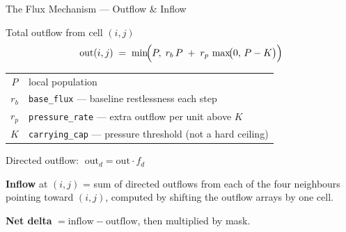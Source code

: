 \documentclass[aspectratio=169]{beamer}
\begin{document}
\begin{frame}{The Flux Mechanism — Outflow \& Inflow}
  \begin{block}{Total outflow from cell $(i,j)$}
    \[
      \mathrm{out}(i,j) \;=\;
        \min\!\Bigl(P,\;
          r_b\,P \;+\; r_p\,\max\!\bigl(0,\,P - K\bigr)
        \Bigr)
    \]
  \end{block}

  \begin{tabular}{@{}cl@{}}
    $P$   & local population \\
    $r_b$ & \texttt{base\_flux} — baseline restlessness each step \\
    $r_p$ & \texttt{pressure\_rate} — extra outflow per unit above $K$ \\
    $K$   & \texttt{carrying\_cap} — pressure threshold (not a hard ceiling) \\
  \end{tabular}

  \vspace{0.8em}
  Directed outflow: $\;\mathrm{out}_d = \mathrm{out}\cdot f_d$

  \vspace{0.4em}
  \textbf{Inflow} at $(i,j)$ = sum of directed outflows from each of the four
  neighbours pointing toward $(i,j)$, computed by shifting the outflow arrays
  by one cell.

  \vspace{0.4em}
  \textbf{Net delta} $= \mathrm{inflow} - \mathrm{outflow}$, then multiplied by
  mask.
\end{frame}
\end{document}
